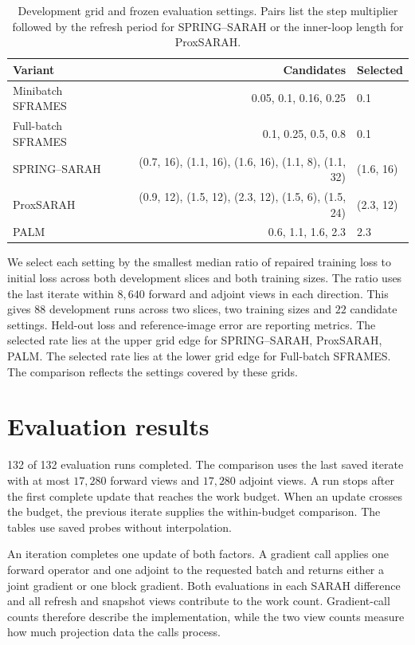 \documentclass[11pt]{article}
\begin{document}
\begin{table}[!htbp]
\centering
\caption{Development grid and frozen evaluation settings. Pairs list the step multiplier followed by the refresh period for SPRING--SARAH or the inner-loop length for ProxSARAH.}
\small
\setlength{\tabcolsep}{4pt}
\begin{tabular}{@{}lrl@{}}
\toprule
Variant & Candidates & Selected \\
\midrule
Minibatch SFRAMES & 0.05, 0.1, 0.16, 0.25 & 0.1 \\
Full-batch SFRAMES & 0.1, 0.25, 0.5, 0.8 & 0.1 \\
SPRING--SARAH & (0.7, 16), (1.1, 16), (1.6, 16), (1.1, 8), (1.1, 32) & (1.6, 16) \\
ProxSARAH & (0.9, 12), (1.5, 12), (2.3, 12), (1.5, 6), (1.5, 24) & (2.3, 12) \\
PALM & 0.6, 1.1, 1.6, 2.3 & 2.3 \\
\bottomrule
\end{tabular}
\end{table}

We select each setting by the smallest median ratio of repaired training loss
to initial loss across both development slices and both training sizes. The
ratio uses the last iterate within \(8{,}640\)
forward and adjoint views in each direction. This gives
\(88\) development runs across two slices, two training sizes and
\(22\) candidate settings. Held-out loss and reference-image error are
reporting metrics.
The selected rate lies at the upper grid edge for SPRING--SARAH, ProxSARAH, PALM. The selected rate lies at the lower grid edge for Full-batch SFRAMES. The comparison reflects the settings covered by these grids.


\section{Evaluation results}
132 of 132 evaluation runs completed. The comparison
uses the last saved iterate with at most \(17{,}280\) forward views and
\(17{,}280\) adjoint views. A run stops after the first complete update that
reaches the work budget. When an update crosses the budget, the previous
iterate supplies the within-budget comparison. The tables use saved probes
without interpolation.

An iteration completes one update of both factors. A gradient call applies
one forward operator and one adjoint to the requested batch and returns either
a joint gradient or one block gradient. Both evaluations in each SARAH
difference and all refresh and snapshot views contribute to the work count.
Gradient-call counts therefore describe the implementation, while the two
view counts measure how much projection data the calls process.
\end{document}
